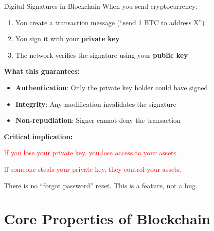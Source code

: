 \documentclass[10pt]{beamer}
\newcommand{\highlight}[1]{\textcolor{AccentOrange}{\textbf{#1}}}
\newcommand{\good}[1]{\textcolor{AccentGreen}{#1}}
\newcommand{\bad}[1]{\textcolor{red}{#1}}
\begin{document}
\begin{frame}{Digital Signatures in Blockchain}
  When you send cryptocurrency:
  \vspace{0.5em}
  \begin{enumerate}
    \item You create a transaction message (``send 1 BTC to address X'')
    \item You sign it with your \highlight{private key}
    \item The network verifies the signature using your \highlight{public key}
  \end{enumerate}
  
  \vspace{1em}
  \textbf{What this guarantees:}
  \begin{itemize}
    \item \good{\bf Authentication}: Only the private key holder could have signed
    \item \good{\bf Integrity}: Any modification invalidates the signature
    \item \good{\bf Non-repudiation}: Signer cannot deny the transaction
  \end{itemize}
  
  \vspace{1em}
  \textbf{Critical implication:}
  
  \bad{If you lose your private key, you lose access to your assets.}
  
  \bad{If someone steals your private key, they control your assets.}
  
  There is no ``forgot password'' reset. This is a feature, not a bug.
\end{frame}

\section{Core Properties of Blockchain}
\end{document}
